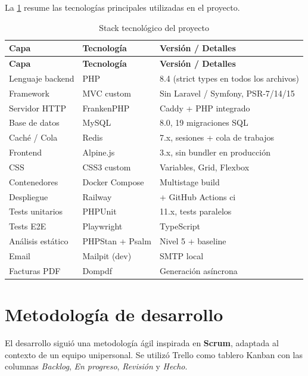 \documentclass[12pt,a4paper,twoside,openright]{report}
\begin{document}
La \cref{tab:stack} resume las tecnologías principales utilizadas en el proyecto.

\begin{longtable}{@{}lll@{}}
  \caption{Stack tecnológico del proyecto}
  \label{tab:stack}\\
  \toprule
  \textbf{Capa} & \textbf{Tecnología} & \textbf{Versión / Detalles}\\
  \midrule
  \endfirsthead
  \toprule
  \textbf{Capa} & \textbf{Tecnología} & \textbf{Versión / Detalles}\\
  \midrule
  \endhead
  \bottomrule
  \endfoot
  Lenguaje backend   & PHP                  & 8.4 (strict types en todos los archivos)\\
  Framework          & MVC custom           & Sin Laravel / Symfony, PSR-7/14/15\\
  Servidor HTTP      & FrankenPHP           & Caddy + PHP integrado\\
  Base de datos      & MySQL                & 8.0, 19 migraciones SQL\\
  Caché / Cola       & Redis                & 7.x, sesiones + cola de trabajos\\
  Frontend           & Alpine.js            & 3.x, sin bundler en producción\\
  CSS                & CSS3 custom          & Variables, Grid, Flexbox\\
  Contenedores       & Docker Compose       & Multistage build\\
  Despliegue         & Railway              & + GitHub Actions \gls{ci}\\
  Tests unitarios    & PHPUnit              & 11.x, tests paralelos\\
  Tests E2E          & Playwright           & TypeScript\\
  Análisis estático  & PHPStan + Psalm      & Nivel 5 + baseline\\
  Email              & Mailpit (dev)        & SMTP local\\
  Facturas PDF       & Dompdf               & Generación asíncrona\\
\end{longtable}

\section{Metodología de desarrollo}
\label{sec:metodologia}

El desarrollo siguió una metodología ágil inspirada en \textbf{Scrum}, adaptada al
contexto de un equipo unipersonal. Se utilizó Trello como tablero Kanban con las
columnas \textit{Backlog}, \textit{En progreso}, \textit{Revisión} y \textit{Hecho}.
\end{document}

